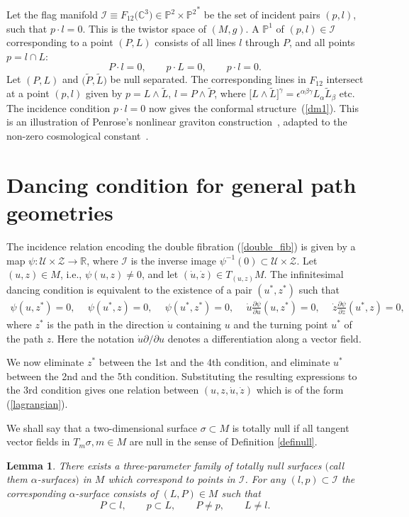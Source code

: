 \documentclass[pdftex]{sigma}%
\numberwithin{equation}{section}
\newtheorem{Lemma}[Theorem]{Lemma}
\newcommand{\C}{\mathbb{C}}
\newcommand{\Z}{\mathbb{Z}}
\newcommand{\PP}{\mathbb{P}}
\newcommand{\tL}{\widetilde{L}}
\newcommand{\tP}{\widetilde{P}}
\newcommand{\R}{\mathbb{R}}
\def\p{\partial}
\def\be{\begin{equation}}
\def\I{\mathcal{I}}
\def\ee{\end{equation}}
\renewcommand{\Z}{\mathcal{Z}}
\newcommand{\U}{\mathcal{U}}
\begin{document}
Let the flag manifold $\I\equiv F_{12}\big(\C^3\big)\in \PP^2\times {\PP^2}^*$ be the set of incident pairs
$(p, l)$, such that $p\cdot l=0$. This is the twistor space \cite{AHS,Ward_cosmo}
of $(M, g)$.
A $\PP^1$ of $(p, l)\in \I$ corresponding to a point $(P, L)$
consists of all lines $l$ through $P$, and all points
$p=l\cap L$:
\[
P\cdot l=0, \qquad p\cdot L=0, \qquad p\cdot l=0.
\]
Let $(P, L)$ and $\big(\tP, \tL\big)$ be null separated. The corresponding lines in $F_{12}$
intersect at a point $(p, l)$ given by
$p=L\wedge \tL$, $l=P\wedge \tP$,
where $\big[L\wedge\tL\big]^{\gamma}=\epsilon^{\alpha\beta\gamma}L_{\alpha}\tL_{\beta}$ etc.
The incidence condition $p\cdot l=0$ now gives the conformal structure~(\ref{dm1}). This is an illustration of Penrose's nonlinear graviton construction~\cite{Penrose}, adapted to the non-zero cosmological constant~\cite{Ward_cosmo}.

\section{Dancing condition for general path geometries}\label{section3}
The incidence relation encoding the double fibration
(\ref{double_fib}) is given by a map $\psi\colon \U\times \Z\rightarrow \R$, where
$\I$ is the inverse image $\psi^{-1}(0)\subset \U\times \Z$.
Let $(u, z)\in M$, i.e., $\psi(u, z)\neq 0$, and let
$(\dot{u}, \dot{z})\in T_{(u, z)} M$. The infinitesimal dancing condition
is equivalent to the existence of a pair $(u^*, z^*)$ such that
\begin{gather*}
\psi(u, z^*)=0, \quad\ \psi(u^*, z)=0, \quad\ \psi (u^*, z^*)=0, \quad\
\dot{u}\frac{\p\psi}{\p u}(u, z^*)=0, \quad\
\dot{z}\frac{\p\psi}{\p z}(u^*, z)=0,
\end{gather*}
where $z^*$ is the path in the direction $\dot{u}$ containing $u$ and
the turning point $u^*$ of the path $z$. Here the notation $\dot{u}\p/\p u$ denotes a differentiation
along a vector field.

We now
eliminate $z^*$ between the 1st and the 4th condition, and eliminate
$u^*$ between the 2nd and the 5th condition. Substituting the resulting
expressions to the 3rd condition gives one relation between
$(u, z, \dot{u}, \dot{z})$ which is of the form (\ref{lagrangian}).

We shall say that a two-dimensional surface $\sigma\subset M$ is totally null
if all tangent vector fields in $T_m\sigma, m\in M$ are null in the sense of
Definition \ref{definull}.
\begin{Lemma}
\label{alpha_s}
There exists a three-parameter family of totally null surfaces
$($call them $\alpha$-surfaces$)$ in $M$ which correspond to points in
${\mathcal I}$. For any $(l, p)\subset {\mathcal I}$ the corresponding
$\alpha$-surface consists of $(L, P)\in M$ such that
\be
\label{alpha_def}
P\subset l, \qquad p\subset L, \qquad P\neq p, \qquad L\neq l.
\ee
\end{Lemma}
\end{document}
